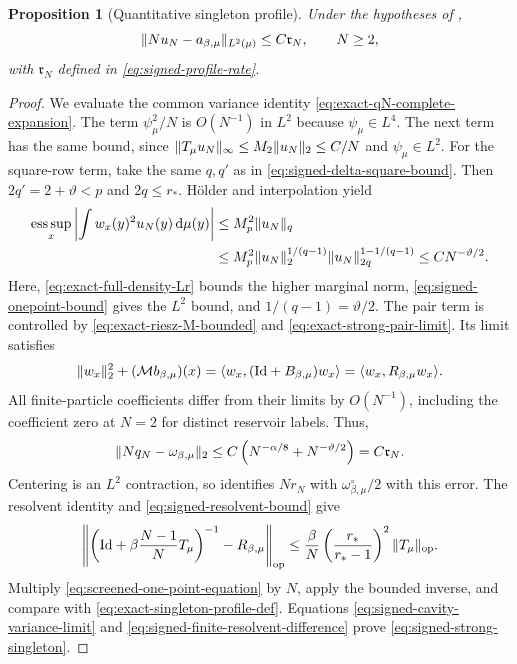 \documentclass[11pt,reqno]{amsart}
\numberwithin{equation}{section}
\theoremstyle{plain}
\newtheorem{prop}[prop]{Proposition}
\theoremstyle{remark}
\DeclarePairedDelimiter{\norm}{\lVert}{\rVert}
\DeclarePairedDelimiter{\ipp}{\langle}{\rangle}
\newcommand{\md}{\mathrm{d}}
\newcommand{\be}{\beta}
\begin{document}
\begin{prop}[Quantitative singleton profile]
\label{prop:signed-strong-singleton}
Under the hypotheses of ,
\begin{equation}\label{eq:signed-strong-singleton}
 \norm{Nu_N-a_{\be,\mu}}_{L^2(\mu)}\leq C\mathfrak r_N,
 \qquad N\geq2,
\end{equation}
with $\mathfrak r_N$ defined in \eqref{eq:signed-profile-rate}.
\end{prop}
\begin{proof}
We evaluate the common variance identity
\eqref{eq:exact-qN-complete-expansion}.  The term $\psi_\mu^2/N$ is
$O(N^{-1})$ in $L^2$ because $\psi_\mu\in L^4$.
The next term has the same bound, since
$\norm{T_\mu u_N}_\infty\leq M_2\norm{u_N}_2\leq C/N$ and
$\psi_\mu\in L^2$.
For the square-row term, take the same $q,q'$ as in
\eqref{eq:signed-delta-square-bound}.  Then $2q'=2+\vartheta<p$ and
$2q\leq r_*$.  H\"older and interpolation yield
\begin{align}
 \operatorname*{ess\,sup}_x
 \left|\int w_x(y)^2u_N(y)\,\md\mu(y)\right|
 &\leq M_p^2\norm{u_N}_q\notag\\
 &\leq M_p^2\norm{u_N}_2^{1/(q-1)}
             \norm{u_N}_{2q}^{1-1/(q-1)}
 \leq C N^{-\vartheta/2}.
 \label{eq:signed-square-row-error}
\end{align}
Here, \eqref{eq:exact-full-density-Lr} bounds the higher marginal norm,
\eqref{eq:signed-onepoint-bound} gives the $L^2$ bound, and
$1/(q-1)=\vartheta/2$.
The pair term is controlled by \eqref{eq:exact-riesz-M-bounded} and
\eqref{eq:exact-strong-pair-limit}.  Its limit satisfies
\begin{equation}\label{eq:signed-variance-identification}
 \norm{w_x}_2^2+(\mathcal M b_{\be,\mu})(x)
 =\ipp*{w_x,(\mathrm{Id}+B_{\be,\mu})w_x}
 =\ipp*{w_x,R_{\be,\mu}w_x}.
\end{equation}
All finite-particle coefficients differ from their limits by $O(N^{-1})$,
including the coefficient zero at $N=2$ for distinct reservoir labels.
Thus,
\begin{equation}\label{eq:signed-cavity-variance-limit}
 \norm{Nq_N-\omega_{\be,\mu}}_2
 \leq C\left(N^{-\alpha/8}+N^{-\vartheta/2}\right)=C\mathfrak r_N.
\end{equation}
Centering is an $L^2$ contraction, so
 identifies $Nr_N$ with
$\omega_{\be,\mu}^\circ/2$ with this error.
The resolvent identity and \eqref{eq:signed-resolvent-bound} give
\begin{equation}\label{eq:signed-finite-resolvent-difference}
 \left\|\left(\mathrm{Id}+\be\frac{N-1}{N}T_\mu\right)^{-1}
                  -R_{\be,\mu}\right\|_{\mathrm{op}}
 \leq\frac\be N\left(\frac{r_*}{r_*-1}\right)^2
                       \norm{T_\mu}_{\mathrm{op}}.
\end{equation}
Multiply \eqref{eq:screened-one-point-equation} by $N$, apply the bounded
inverse, and compare with \eqref{eq:exact-singleton-profile-def}.
Equations \eqref{eq:signed-cavity-variance-limit} and
\eqref{eq:signed-finite-resolvent-difference} prove
\eqref{eq:signed-strong-singleton}.
\end{proof}
\end{document}
